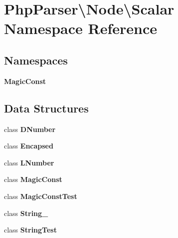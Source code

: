 \section{Php\+Parser\textbackslash{}Node\textbackslash{}Scalar Namespace Reference}
\label{namespace_php_parser_1_1_node_1_1_scalar}
\subsection*{Namespaces}
\begin{DoxyCompactItemize}
\item 
 {\bf Magic\+Const}
\end{DoxyCompactItemize}
\subsection*{Data Structures}
\begin{DoxyCompactItemize}
\item 
class {\bf D\+Number}
\item 
class {\bf Encapsed}
\item 
class {\bf L\+Number}
\item 
class {\bf Magic\+Const}
\item 
class {\bf Magic\+Const\+Test}
\item 
class {\bf String\+\_\+}
\item 
class {\bf String\+Test}
\end{DoxyCompactItemize}
